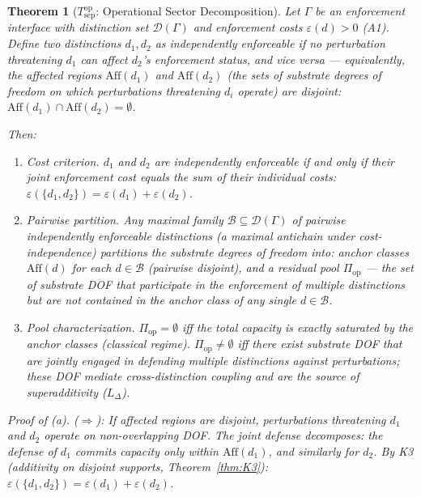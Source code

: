 \documentclass[11pt,a4paper]{article}
\newtheorem{theorem}{Theorem}[section]
\theoremstyle{definition}
\newcommand{\eps}{\varepsilon}
\begin{document}
\begin{theorem}[$T_{\mathrm{sep}}^{\mathrm{op}}$: Operational Sector Decomposition]\label{thm:Tsep_op}
Let $\Gamma$ be an enforcement interface with distinction set $\mathcal{D}(\Gamma)$ and enforcement costs $\eps(d) > 0$ (A1).  Define two distinctions $d_1, d_2$ as \emph{independently enforceable} if no perturbation threatening $d_1$ can affect $d_2$'s enforcement status, and vice versa --- equivalently, the affected regions $\mathrm{Aff}(d_1)$ and $\mathrm{Aff}(d_2)$ (the sets of substrate degrees of freedom on which perturbations threatening $d_i$ operate) are disjoint: $\mathrm{Aff}(d_1) \cap \mathrm{Aff}(d_2) = \emptyset$.

Then:
\begin{enumerate}[nosep,label=(\alph*),leftmargin=2em]
\item \textit{Cost criterion.}  $d_1$ and $d_2$ are independently enforceable if and only if their joint enforcement cost equals the sum of their individual costs: $\eps(\{d_1, d_2\}) = \eps(d_1) + \eps(d_2)$.
\item \textit{Pairwise partition.}  Any maximal family $\mathcal{B} \subseteq \mathcal{D}(\Gamma)$ of pairwise independently enforceable distinctions (a maximal antichain under cost-independence) partitions the substrate degrees of freedom into: anchor classes $\mathrm{Aff}(d)$ for each $d \in \mathcal{B}$ (pairwise disjoint), and a residual \emph{pool} $\Pi_{\mathrm{op}}$ --- the set of substrate DOF that participate in the enforcement of multiple distinctions but are not contained in the anchor class of any single $d \in \mathcal{B}$.
\item \textit{Pool characterization.}  $\Pi_{\mathrm{op}} = \emptyset$ iff the total capacity is exactly saturated by the anchor classes (classical regime).  $\Pi_{\mathrm{op}} \ne \emptyset$ iff there exist substrate DOF that are jointly engaged in defending multiple distinctions against perturbations; these DOF mediate cross-distinction coupling and are the source of superadditivity ($L_\Delta$).
\end{enumerate}

\smallskip\noindent\textit{Proof of (a).}  ($\Rightarrow$): If affected regions are disjoint, perturbations threatening $d_1$ and $d_2$ operate on non-overlapping DOF.  The joint defense decomposes: the defense of $d_1$ commits capacity only within $\mathrm{Aff}(d_1)$, and similarly for $d_2$.  By K3 (additivity on disjoint supports, Theorem~\ref{thm:K3}): $\eps(\{d_1,d_2\}) = \eps(d_1) + \eps(d_2)$.


\end{theorem}
\end{document}
